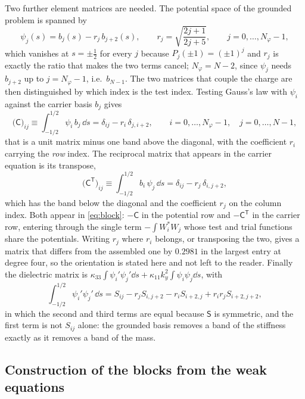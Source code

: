 Two further element matrices are needed.  The potential space of the grounded
problem is spanned by
\begin{equation*}
\psi_j(s)=b_j(s)-r_j\,b_{j+2}(s),\qquad
r_j=\sqrt{\frac{2j+1}{2j+5}},\qquad j=0,\dots,N_\varphi-1 ,
\end{equation*}
which vanishes at $s=\pm\tfrac12$ for every $j$ because $P_j(\pm1)=(\pm1)^j$ and
$r_j$ is exactly the ratio that makes the two terms cancel; $N_\varphi=N-2$,
since $\psi_j$ needs $b_{j+2}$ up to $j=N_\varphi-1$, i.e.\ $b_{N-1}$.  The two
matrices that couple the charge are then distinguished by which index is the test
index.  Testing Gauss's law with $\psi_i$ against the carrier basis $b_j$ gives
\begin{equation*}
\bigl(\mathsf C\bigr)_{ij}\equiv\int_{-1/2}^{1/2}\psi_i\,b_j\,\dd s
=\delta_{ij}-r_i\,\delta_{j,i+2},
\qquad i=0,\dots,N_\varphi-1,\quad j=0,\dots,N-1 ,
\end{equation*}
that is a unit matrix minus one band above the diagonal, with the coefficient
$r_i$ carrying the \emph{row} index.  The reciprocal matrix that appears in the
carrier equation is its transpose,
\begin{equation*}
\bigl(\mathsf C^{\mathsf T}\bigr)_{ij}\equiv\int_{-1/2}^{1/2}b_i\,\psi_j\,\dd s
=\delta_{ij}-r_j\,\delta_{i,j+2},
\end{equation*}
which has the band below the diagonal and the coefficient $r_j$ on the column
index.  Both appear in \eqref{eq:block}: $-\mathsf C$ in the potential row and
$-\mathsf C^{\mathsf T}$ in the carrier row, entering through the single term
$-\int W_i^{*}W_j$ whose test and trial functions share the potentials.  Writing
$r_j$ where $r_i$ belongs, or transposing the two, gives a matrix that differs
from the assembled one by $0.2981$ in the largest entry at degree four, so the orientation is stated here and not left to the reader.  Finally
the dielectric matrix is
$\kappa_{33}\int\psi_i'\psi_j'\dd s+\kappa_{11}k_y^{2}\int\psi_i\psi_j\dd s$,
with
\begin{equation*}
\int_{-1/2}^{1/2}\psi_i'\psi_j'\,\dd s
=S_{ij}-r_jS_{i,j+2}-r_iS_{i+2,j}+r_ir_jS_{i+2,j+2},
\end{equation*}
in which the second and third terms are equal because $\mathsf S$ is symmetric,
and the first term is not $S_{ij}$ alone: the grounded basis removes a band of
the stiffness exactly as it removes a band of the mass.

\subsection{Construction of the blocks from the weak equations}


